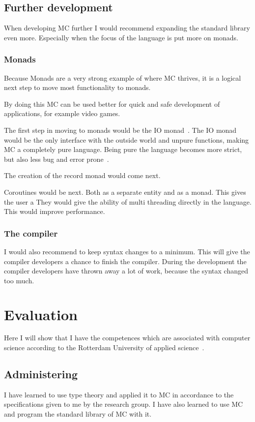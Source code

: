 \section{Further development}
When developing MC further I would recommend expanding the standard library even more.
Especially when the focus of the language is put more on monads.

\subsection{Monads}
Because Monads are a very strong example of where MC thrives, it is a logical next step to move most functionality to monads.

By doing this MC can be used better for quick and safe development of applications, for example video games.

The first step in moving to monads would be the IO monad~\cite{iomonad}.
The IO monad would be the only interface with the outside world and unpure functions, making MC a completely pure language.
Being pure the language becomes more strict, but also less bug and error prone~\cite{purelanguage}.


The creation of the record monad would come next.

Coroutines would be next.
Both as a separate entity and as a monad.
This gives the user a
They would give the ability of multi threading directly in the language.
This would improve performance.


\subsection{The compiler}
I would also recommend to keep syntax changes to a minimum.
This will give the compiler developers a chance to finish the compiler.
During the development the compiler developers have thrown away a lot of work, because the syntax changed too much.



\chapter{Evaluation}
Here I will show that I have the competences which are associated with computer science according to the Rotterdam University of applied science~\cite{citeershit}.


\section{Administering}
I have learned to use type theory and applied it to MC in accordance to the specifications given to me by the research group.
I have also learned to use MC and program the standard library of MC with it.




